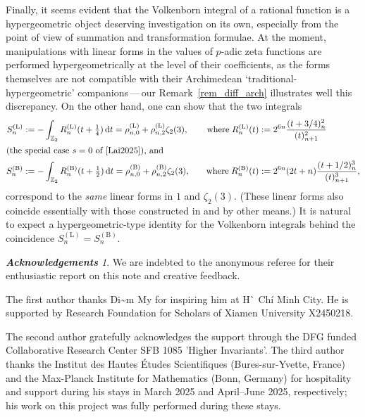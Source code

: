 \documentclass[12pt]{article}
\renewcommand{\d}{\mathrm{d}}
\theoremstyle{remark}
\newtheorem*{acknowledgements}{\bf Acknowledgements}
\numberwithin{equation}{section}
\begin{document}
Finally, it seems evident that the Volkenborn integral of a rational function is a hypergeometric object deserving investigation on its own, especially from the point of view of summation and transformation formulae. At the moment, manipulations with linear forms in the values of $p$-adic zeta functions are performed hypergeometrically at the level of their coefficients, as the forms themselves are not compatible with their Archimedean `traditional-hypergeometric' companions\,---\,our Remark~\ref{rem_diff_arch} illustrates well this discrepancy.
On the other hand, one can show that the two integrals
\begin{alignat*}{2}
S_n^{(\mathrm{L})}
&:= -\int_{\mathbb{Z}_2} R_n^{(\mathrm{L})}(t+\tfrac{1}{4}) \,\d t
=\rho_{n,0}^{(\mathrm{L})} + \rho_{n,2}^{(\mathrm{L})} \zeta_2(3),
&\quad\text{where}\;
R_n^{(\mathrm{L})}(t) &:= 2^{6n} \frac{(t+3/4)_n^2}{(t)_{n+1}^2}
\\ \intertext{(the special case $s=0$ of \cite[Theorem 1.5]{Lai2025}), and}
S_n^{(\mathrm{B})}
&:= -\int_{\mathbb{Z}_2} R_n^{(\mathrm{B})}(t+\tfrac{1}{2}) \,\d t
=\rho_{n,0}^{(\mathrm{B})} + \rho_{n,2}^{(\mathrm{B})} \zeta_2(3),
&\quad\text{where}\;
R_n^{(\mathrm{B})}(t) &:= 2^{6n} (2t+n) \frac{(t+1/2)_n^3}{(t)_{n+1}^3},
\end{alignat*}
correspond to the \emph{same} linear forms in $1$ and $\zeta_2(3)$.
(These linear forms also coincide essentially with those constructed in \cite{Cal2005} and \cite{Beu2008} by other means.)
It is natural to expect a hypergeometric-type identity for the Volkenborn integrals behind the coincidence $S_n^{(\mathrm{L})}=S_n^{(\mathrm{B})}$.


\begin{acknowledgements}
We are indebted to the anonymous referee for their enthusiastic report on this note and creative feedback.
\begin{otherlanguage}{vietnamese}
The first author thanks Di{\~\ecircumflex}m My for inspiring him at H{\`\ocircumflex} Ch{\'i} Minh City.
He is supported by Research Foundation for Scholars of Xiamen University X2450218.
\end{otherlanguage}
The second author  gratefully acknowledges the support through the DFG funded Collaborative Research Center SFB 1085 'Higher Invariants'.
The third author thanks the Institut des Hautes \'Etudes Scientifiques (Bures-sur-Yvette, France) and the Max-Planck Institute for Mathematics (Bonn, Germany) for hospitality and support during his stays in March 2025 and April--June 2025, respectively; his work on this project was fully performed during these stays.
\end{acknowledgements}
\end{document}
